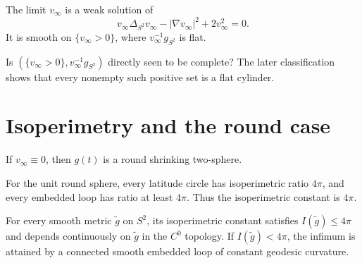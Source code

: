 \begin{lemma}
\label{lem:chow-iv-backward-pressure-stationary}
The limit \(v_\infty\) is a weak solution of
\[
 v_\infty\Delta_{S^2}v_\infty-|\nabla v_\infty|^2+2v_\infty^2=0.
\]
It is smooth on \(\{v_\infty>0\}\), where
\(v_\infty^{-1}g_{S^2}\) is flat.
\end{lemma}

\begin{remark}
\label{rem:chow-iv-completeness-positive-pressure-set}
Is \((\{v_\infty>0\},v_\infty^{-1}g_{S^2})\) directly seen to be complete?
The later classification shows that every nonempty such positive set is a
flat cylinder.
\end{remark}

\section{Isoperimetry and the round case}

\begin{proposition}
\label{prop:chow-iv-zero-backward-pressure-round}
If \(v_\infty\equiv0\), then \(g(t)\) is a round shrinking two-sphere.
\end{proposition}

\begin{example}
\label{ex:chow-iv-unit-sphere-isoperimetric-constant}
For the unit round sphere, every latitude circle has isoperimetric ratio
\(4\pi\), and every embedded loop has ratio at least \(4\pi\).  Thus the
isoperimetric constant is \(4\pi\).
\end{example}

\begin{lemma}
\label{lem:chow-iv-isoperimetric-minimizers}
For every smooth metric \(\widetilde g\) on \(S^2\), its isoperimetric
constant satisfies \(I(\widetilde g)\le4\pi\) and depends continuously on
\(\widetilde g\) in the \(C^0\) topology.  If \(I(\widetilde g)<4\pi\), the
infimum is attained by a connected smooth embedded loop of constant geodesic
curvature.
\end{lemma}

